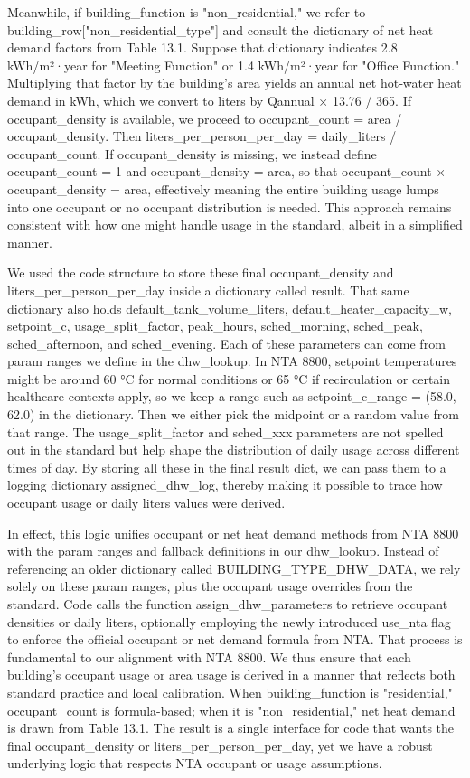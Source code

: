 Meanwhile, if building_function is "non_residential," we refer to building_row["non_residential_type"] and consult the dictionary of net heat demand factors from Table 13.1. Suppose that dictionary indicates 2.8 kWh/m²·year for "Meeting Function" or 1.4 kWh/m²·year for "Office Function." Multiplying that factor by the building’s area yields an annual net hot‐water heat demand in kWh, which we convert to liters by Qannual × 13.76 / 365. If occupant_density is available, we proceed to occupant_count = area / occupant_density. Then liters_per_person_per_day = daily_liters / occupant_count. If occupant_density is missing, we instead define occupant_count = 1 and occupant_density = area, so that occupant_count × occupant_density = area, effectively meaning the entire building usage lumps into one occupant or no occupant distribution is needed. This approach remains consistent with how one might handle usage in the standard, albeit in a simplified manner.

We used the code structure to store these final occupant_density and liters_per_person_per_day inside a dictionary called result. That same dictionary also holds default_tank_volume_liters, default_heater_capacity_w, setpoint_c, usage_split_factor, peak_hours, sched_morning, sched_peak, sched_afternoon, and sched_evening. Each of these parameters can come from param ranges we define in the dhw_lookup. In NTA 8800, setpoint temperatures might be around 60 °C for normal conditions or 65 °C if recirculation or certain healthcare contexts apply, so we keep a range such as setpoint_c_range = (58.0, 62.0) in the dictionary. Then we either pick the midpoint or a random value from that range. The usage_split_factor and sched_xxx parameters are not spelled out in the standard but help shape the distribution of daily usage across different times of day. By storing all these in the final result dict, we can pass them to a logging dictionary assigned_dhw_log, thereby making it possible to trace how occupant usage or daily liters values were derived.

In effect, this logic unifies occupant or net heat demand methods from NTA 8800 with the param ranges and fallback definitions in our dhw_lookup. Instead of referencing an older dictionary called BUILDING_TYPE_DHW_DATA, we rely solely on these param ranges, plus the occupant usage overrides from the standard. Code calls the function assign_dhw_parameters to retrieve occupant densities or daily liters, optionally employing the newly introduced use_nta flag to enforce the official occupant or net demand formula from NTA. That process is fundamental to our alignment with NTA 8800. We thus ensure that each building’s occupant usage or area usage is derived in a manner that reflects both standard practice and local calibration. When building_function is "residential," occupant_count is formula-based; when it is "non_residential," net heat demand is drawn from Table 13.1. The result is a single interface for code that wants the final occupant_density or liters_per_person_per_day, yet we have a robust underlying logic that respects NTA occupant or usage assumptions.

